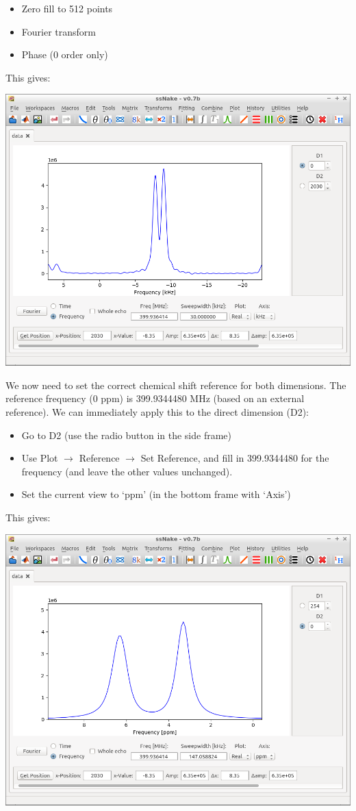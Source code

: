 \documentclass[11pt,a4paper]{article}
\begin{document}
\begin{itemize}
  \item Zero fill to 512 points
  \item Fourier transform
  \item Phase (0 order only)
\end{itemize}
This gives:
\begin{center}
\includegraphics[width=0.7\linewidth]{Figs/Fig5.png}
\end{center}

We now need to set the correct chemical shift reference for both dimensions. The reference frequency
(0 ppm) is  399.9344480 MHz (based on an external reference). We can immediately apply this to the
direct dimension (D2):


\begin{itemize}
  \item Go to D2 (use the radio button in the side frame)
  \item Use Plot $\longrightarrow$ Reference $\longrightarrow$ Set Reference, and fill in
	 399.9344480 for the frequency (and leave the other values unchanged).
	\item Set the current view to `ppm' (in the bottom frame with `Axis')
\end{itemize}
This gives:

\begin{center}
\includegraphics[width=0.7\linewidth]{Figs/Fig6.png}
\end{center}
\end{document}

